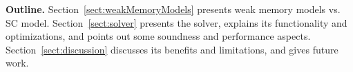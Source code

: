 {\bf Outline.} %
Section~\ref{sect:weakMemoryModels} presents weak memory models vs. SC
model.  Section~\ref{sect:solver} presents the solver, 
explains its functionality and optimizations, 
and points out some soundness and performance aspects.
Section~\ref{sect:discussion} discusses its benefits and limitations, and gives future work.



